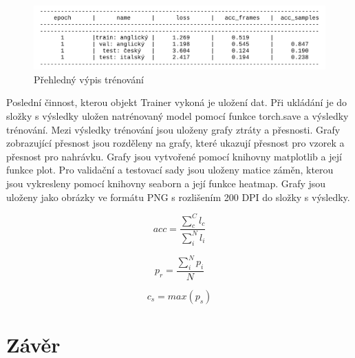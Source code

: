 \documentclass[FM,BP]{tulthesis}
\begin{document}
\begin{figure}[htbp]
\centerline{\includegraphics[scale=.215]{train_log.png}}
\caption{Přehledný výpis trénování}
\label{fig}
\end{figure}

Poslední činnost, kterou objekt Trainer vykoná je uložení dat. Při ukládání je do složky s výsledky uložen natrénovaný model pomocí funkce torch.save a výsledky trénování. Mezi výsledky trénování jsou uloženy grafy ztráty a přesnosti. Grafy zobrazující přesnost jsou rozděleny na grafy, které ukazují přesnost pro vzorek a přesnost pro nahrávku. Grafy jsou vytvořené pomocí knihovny matplotlib a její funkce plot. Pro validační a testovací sady jsou uloženy matice záměn, kterou jsou vykresleny pomocí knihovny seaborn a její funkce heatmap. Grafy jsou uloženy jako obrázky ve formátu PNG s rozlišením 200 DPI do složky s výsledky.

$$ acc = \frac{\sum_{c}^{C}{l_c}}{\sum_{i}^{N}{l_i}}  $$ 

$$ p_r = \frac{\sum_{i}^{N}{p_i}}{N} $$

$$ c_s = max(p_s) $$


\chapter{Závěr}

\nocite{*}
\printbibliography[title={Použitá literatura}] %
\end{document}
